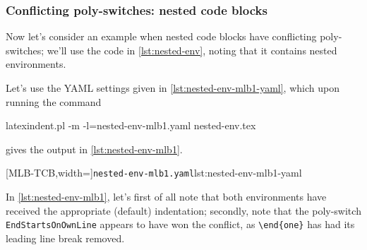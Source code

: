 \subsubsection{Conflicting poly-switches: nested code blocks}
 \begin{example}
 Now let's consider an example when nested code blocks have conflicting poly-switches;
 we'll use the code in \cref{lst:nested-env}, noting that it contains nested environments.


 Let's use the YAML settings given in \cref{lst:nested-env-mlb1-yaml}, which upon running
 the command  

 \begin{commandshell}
latexindent.pl -m -l=nested-env-mlb1.yaml nested-env.tex
\end{commandshell}

 gives the output in \cref{lst:nested-env-mlb1}.

 \begin{cmhtcbraster}[raster column skip=.05\linewidth]
  [MLB-TCB,width=\linewidth]{\texttt{nested-env-mlb1.yaml}}{lst:nested-env-mlb1-yaml}
 \end{cmhtcbraster}

 In \cref{lst:nested-env-mlb1}, let's first of all note that both environments have
 received the appropriate (default) indentation; secondly, note that the poly-switch
 \texttt{EndStartsOnOwnLine} appears to have won the conflict, as \lstinline!\end{one}!
 has had its leading line break removed.
 \end{example}


